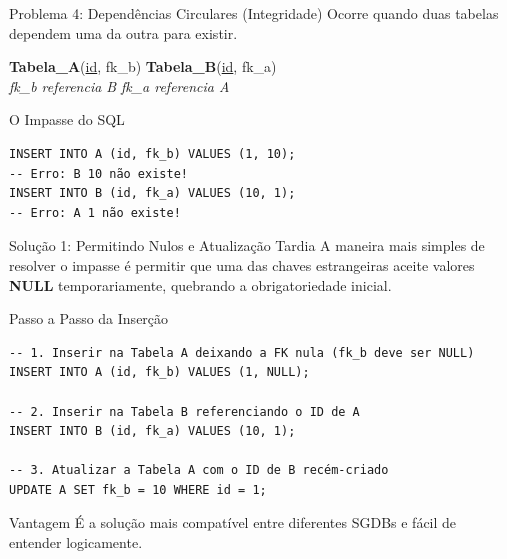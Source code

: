 \documentclass[9pt]{beamer}
\begin{document}
\begin{frame}[fragile]{Problema 4: Dependências Circulares (Integridade)}
  \small
  Ocorre quando duas tabelas dependem uma da outra para existir.
  \vspace{0.4cm}
  \centering
  \centering\scriptsize
  \textbf{Tabela\_A}(\underline{id}, \color{red}fk\_b\color{black}) \quad \textbf{Tabela\_B}(\underline{id}, \color{red}fk\_a\color{black}) \\
  \textit{fk\_b referencia B} \quad \textit{fk\_a referencia A}
  \vspace{0.2cm}
  \begin{exampleblock}{O Impasse do SQL}
\begin{lstlisting}
INSERT INTO A (id, fk_b) VALUES (1, 10);
-- Erro: B 10 não existe!
INSERT INTO B (id, fk_a) VALUES (10, 1);
-- Erro: A 1 não existe!
\end{lstlisting}
  \end{exampleblock}
\end{frame}

\begin{frame}[fragile]{Solução 1: Permitindo Nulos e Atualização Tardia}
  \small
  A maneira mais simples de resolver o impasse é permitir que uma das chaves estrangeiras aceite valores \textbf{NULL} temporariamente, quebrando a obrigatoriedade inicial.
  \vspace{0.2cm}
  \begin{exampleblock}{Passo a Passo da Inserção}
\begin{lstlisting}
-- 1. Inserir na Tabela A deixando a FK nula (fk_b deve ser NULL)
INSERT INTO A (id, fk_b) VALUES (1, NULL);

-- 2. Inserir na Tabela B referenciando o ID de A
INSERT INTO B (id, fk_a) VALUES (10, 1);

-- 3. Atualizar a Tabela A com o ID de B recém-criado
UPDATE A SET fk_b = 10 WHERE id = 1;
\end{lstlisting}
  \end{exampleblock}
  \begin{alertblock}{Vantagem}
    É a solução mais compatível entre diferentes SGDBs e fácil de entender logicamente.
  \end{alertblock}
\end{frame}
\end{document}
